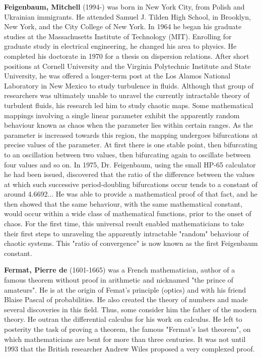 \textbf{Feigenbaum, Mitchell} (1994-)  was born in New York City, from Polish and Ukrainian immigrants. He attended Samuel J. Tilden High School, in Brooklyn, New York, and the City College of New York. In 1964 he began his graduate studies at the Massachusetts Institute of Technology (MIT). Enrolling for graduate study in electrical engineering, he changed his area to physics. He completed his doctorate in 1970 for a thesis on dispersion relations. After short positions at Cornell University and the Virginia Polytechnic Institute and State University, he was offered a longer-term post at the Los Alamos National Laboratory in New Mexico to study turbulence in fluids. Although that group of researchers was ultimately unable to unravel the currently intractable theory of turbulent fluids, his research led him to study chaotic maps. Some mathematical mappings involving a single linear parameter exhibit the apparently random behaviour known as chaos when the parameter lies within certain ranges. As the parameter is increased towards this region, the mapping undergoes bifurcations at precise values of the parameter. At first there is one stable point, then bifurcating to an oscillation between two values, then bifurcating again to oscillate between four values and so on. In 1975, Dr. Feigenbaum, using the small HP-65 calculator he had been issued, discovered that the ratio of the difference between the values at which such successive period-doubling bifurcations occur tends to a constant of around 4.6692... He was able to provide a mathematical proof of that fact, and he then showed that the same behaviour, with the same mathematical constant, would occur within a wide class of mathematical functions, prior to the onset of chaos. For the first time, this universal result enabled mathematicians to take their first steps to unraveling the apparently intractable "random" behaviour of chaotic systems. This "ratio of convergence" is now known as the first Feigenbaum constant.

\textbf{Fermat, Pierre de} (1601-1665) was a French mathematician, author of a famous theorem without proof in arithmetic and nicknamed "the prince of amateurs". He is at the origin of Femat's principle (optics) and with his friend Blaise Pascal of probabilities. He also created the theory of numbers and made several discoveries in this field. Thus, some consider him the father of the modern theory. He outran the differential calculus for his work on calculus. He left to posterity the task of proving a theorem, the famous "Fermat's last theorem", on which mathematicians are bent for more than three centuries. It was not until 1993 that the British researcher Andrew Wiles proposed a very complexed proof.

